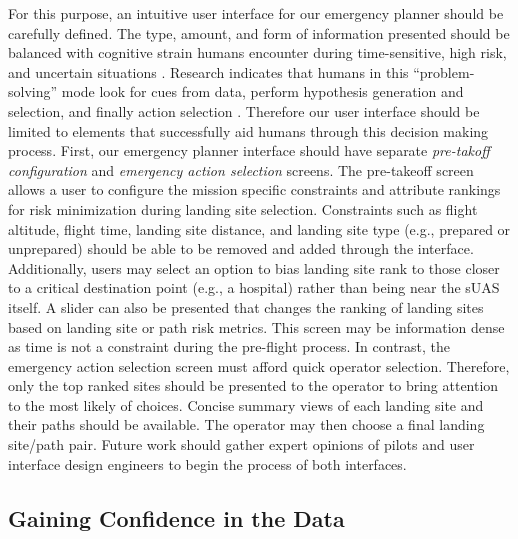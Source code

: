 For this purpose, an intuitive user interface for our emergency planner should be carefully defined. The type, amount, and form of information presented should be balanced with cognitive strain humans encounter during time-sensitive, high risk, and uncertain situations \cite{2003_technical_review_human_error}. Research indicates that humans in this ``problem-solving'' mode look for cues from data, perform hypothesis generation and selection, and finally action selection \cite{wickens_5_1988}. Therefore our user interface should be limited to elements that successfully aid humans through this decision making process. First, our emergency planner interface should have separate \emph{pre-takoff configuration} and \emph{emergency action selection} screens. The pre-takeoff screen allows a user to configure the mission specific constraints and attribute rankings for risk minimization during landing site selection. Constraints such as flight altitude, flight time, landing site distance, and landing site type (e.g., prepared or unprepared) should be able to be removed and added through the interface. Additionally, users may select an option to bias landing site rank to those closer to a critical destination point (e.g., a hospital) rather than being near the \ac{sUAS} itself. A slider can also be presented that changes the ranking of landing sites based on landing site or path risk metrics. This screen may be information dense as time is not a constraint during the pre-flight process. In contrast, the emergency action selection screen must afford quick operator selection. Therefore, only the top ranked sites should be presented to the operator to bring attention to the most likely of choices. Concise summary views of each landing site and their paths should be available. The operator may then choose a final landing site/path pair. Future work should gather expert opinions of pilots and user interface design engineers to begin the process of both interfaces.

\subsection{Gaining Confidence in the Data}

